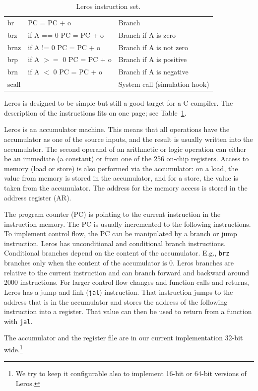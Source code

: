 \documentclass[%
    10pt,
    headinclude, footinclude=false,
    openright, %
    notitlepage,
    cleardoublepage=empty,
    headsepline,
    numbers=noenddot,
    bibliography=totoc, index=totoc,
    ]{scrbook}
\newcommand{\code}[1]{{\lstinline[basicstyle=\small\ttfamily]{#1}}}
\begin{document}
\begin{table}
\begin{tabular}{lll}
br & PC = PC + o & Branch \\
brz & if A == 0 PC = PC + o & Branch if A is zero \\
brnz & if A != 0 PC = PC + o  & Branch if A is not zero \\
brp & if A $>=$ 0 PC = PC + o & Branch if A is positive \\
brn & if A $<$ 0 PC = PC + o & Branch if A is negative \\
scall &  & System call (simulation hook) \\
\bottomrule
\end{tabular}
\caption{Leros instruction set.}
\label{tab:leros:isa}
\end{table}

Leros is designed to be simple but still a good target for a C compiler.
The description of the instructions fits on one page; see Table~\ref{tab:leros:isa}.

Leros is an accumulator machine. This means that all operations
have the accumulator as one of the source inputs, and the result is usually
written into the accumulator. The second operand of an arithmetic or logic
operation can either be an immediate (a constant) or from one of the 256
on-chip registers. Access to memory (load or store) is also performed via
the accumulator: on a load, the value from memory is stored in the accumulator,
and for a store, the value is taken from the accumulator. The address for the
memory access is stored in the address register (AR).

The program counter (PC) is pointing to the current instruction in the
instruction memory. The PC is usually incremented to the following instructions.
To implement control flow, the PC can be manipulated by a branch
or jump instruction.
Leros has unconditional and conditional branch instructions.
Conditional branches depend on the content of the accumulator.
E.g., \code{brz} branches only when the content of the accumulator is 0.
Leros branches are relative to the current instruction and can branch forward
and backward around 2000 instructions.
For larger control flow changes and function calls and returns,
Leros has a jump-and-link (\code{jal}) instruction.
That instruction jumps to the address that is in the accumulator and
stores the address of the following instruction into a register.
That value can then be used to return from a function with \code{jal}.

The accumulator and the register file are in our current implementation
32-bit wide.\footnote{We try to keep it configurable also
to implement 16-bit or 64-bit versions of Leros.}
\end{document}
